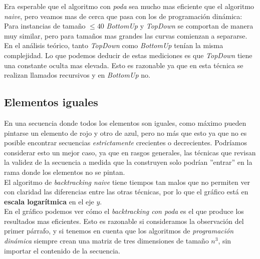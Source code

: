 Era esperable que el algoritmo con \textit{poda} sea mucho mas eficiente que el algoritmo \textit{naive}, pero veamos mas de cerca que pasa con los de programación dinámica: \\


Para instancias de tamaño $\leq 40$ \textit{BottomUp} y \textit{TopDown} se comportan de manera muy similar, pero para tamaños mas grandes las curvas comienzan a separarse. \\

En el análisis teórico, tanto \textit{TopDown} como \textit{BottomUp} tenían la misma complejidad. Lo que podemos deducir de estas mediciones es que \textit{TopDown} tiene una constante oculta mas elevada. Esto es razonable ya que en esta técnica se realizan llamados recursivos y en \textit{BottomUp} no. 

\subsection{Elementos iguales}

En una secuencia donde todos los elementos son iguales, como máximo pueden pintarse un elemento de rojo y otro de azul, pero no más que esto ya que no es posible encontrar secuencias \textit{estrictamente} crecientes o decrecientes. Podríamos considerar esto un mejor caso, ya que en rasgos generales, las técnicas que revisan la validez de la secuencia a medida que la construyen solo podrían ''entrar'' en la rama donde los elementos no se pintan. \\

El algoritmo de \textit{backtracking naive} tiene tiempos tan malos que no permiten ver con claridad las diferencias entre las otras técnicas, por lo que el gráfico está en \textbf{escala logarítmica} en el eje $y$. \\

En el gráfico podemos ver cómo el \textit{backtracking con poda} es el que produce los resultados mas eficientes. Esto es razonable si consideramos la observación del primer párrafo, y si tenemos en cuenta que los algoritmos de \textit{programación dinámica} siempre crean una matriz de tres dimensiones de tamaño $n^3$, sin importar el contenido de la secuencia. \\


